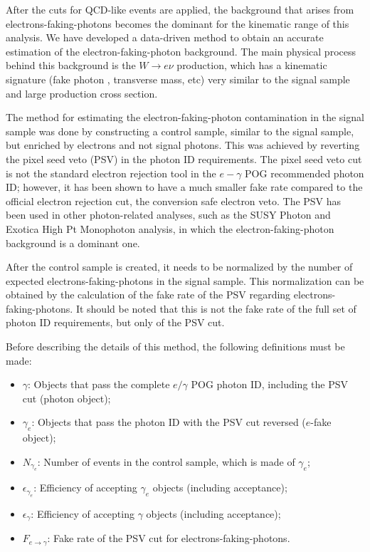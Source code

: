 
After the cuts for QCD-like events are applied, the background that arises from electrons-faking-photons becomes the dominant for the kinematic range of this analysis. We have developed a data-driven method to obtain an accurate estimation of the electron-faking-photon background.
The main physical process behind this background is the $W\rightarrow e \nu$ production, which has a kinematic signature (fake photon \et, transverse mass, etc) very similar to the signal sample and large production cross section.

The method for estimating the electron-faking-photon contamination in the signal sample was done by constructing a control sample, similar to the signal sample, but enriched by electrons and not signal photons. This was achieved by reverting the pixel seed veto (PSV) in the photon ID requirements. The pixel seed veto cut is not the standard electron rejection tool in the $e-\gamma$ POG recommended photon ID; however, it has been shown to have a much smaller fake rate compared to the official electron rejection cut, the conversion safe electron veto. The PSV has been used in other photon-related analyses, such as the SUSY Photon and Exotica High Pt Monophoton analysis, in which the electron-faking-photon background is a dominant one.

After the control sample is created, it needs to be normalized by the number of expected electrons-faking-photons in the signal sample. This normalization can be obtained by the calculation of the fake rate of the PSV regarding electrons-faking-photons. It should be noted that this is not the fake rate of the full set of photon ID requirements, but only of the PSV cut. 

Before describing the details of this method, the following definitions must be made:

\begin{itemize}
\item $\gamma$: Objects that pass the complete $e/\gamma$ POG photon ID, including the PSV cut (photon object);
\item $\gamma_e$: Objects that pass the photon ID with the PSV cut reversed ($e$-fake object);
\item $N_{\gamma_e}$: Number of events in the control sample, which is made of $\gamma_e$;
\item $\epsilon_{\gamma_e}$: Efficiency of accepting $\gamma_e$ objects (including acceptance);
\item $\epsilon_{\gamma}$: Efficiency of accepting $\gamma$ objects (including acceptance);
\item $F_{e\rightarrow\gamma}$: Fake rate of the PSV cut for electrons-faking-photons.
\end{itemize}

